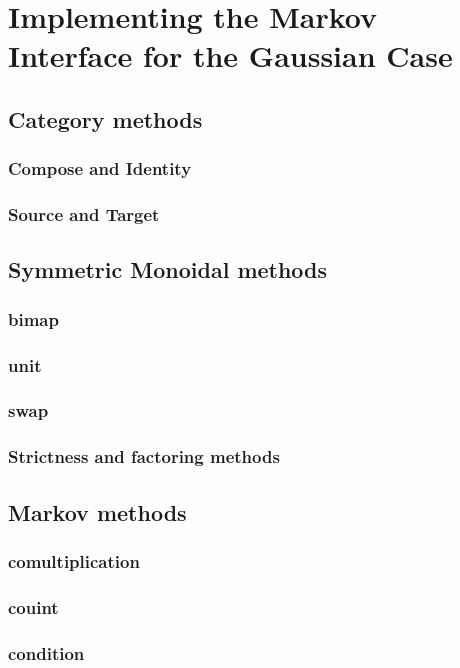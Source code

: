 \section{Implementing the Markov Interface for the Gaussian Case}
    \subsection{Category methods}
	\subsubsection{Compose and Identity}
	\subsubsection{Source and Target}
    \subsection{Symmetric Monoidal methods}
	\subsubsection{bimap}
	\subsubsection{unit}
	\subsubsection{swap}
	\subsubsection{Strictness and factoring methods}
    \subsection{Markov methods}
	\subsubsection{comultiplication}
	\subsubsection{couint}
	\subsubsection{condition}
